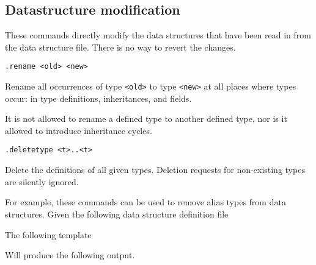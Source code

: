 \subsection{Datastructure modification}
These commands directly modify the data structures that have been
read in from the data structure file. There is no way to revert the
changes.
\begin{verbatim}
.rename <old> <new>
\end{verbatim}
\begin{desc}
Rename all occurrences of type \verb'<old>' to type \verb'<new>' at
all places where types occur: in type definitions, inheritances,
and fields.

It is not allowed to rename a defined type to another defined type,
nor is it allowed to introduce inheritance cycles.
\end{desc}
\begin{verbatim}
.deletetype <t>..<t>
\end{verbatim}
\begin{desc}
Delete the definitions of all given types. Deletion requests for
non-existing types are silently ignored.
\end{desc}
For example, these commands can be used to remove alias types from
data structures. Given the following data structure definition file
\begin{showfile}

\end{showfile}
The following template
\begin{showfile}

\end{showfile}
Will produce the following output.
\begin{showfile}

\end{showfile}
